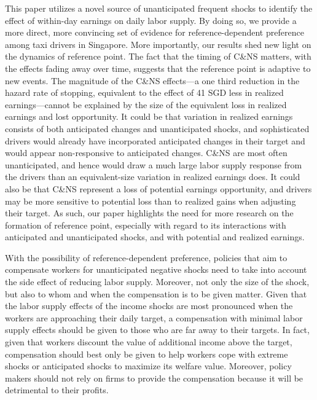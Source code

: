 \documentclass[reviewmode,AEJ]{AEA}
\begin{document}
This paper utilizes a novel source of unanticipated frequent shocks to identify the effect of within-day 
earnings on daily labor supply. By doing so, we provide a more direct, more convincing set of evidence for 
reference-dependent preference among taxi drivers in Singapore. More importantly, our results shed new light 
on the dynamics of reference point. The fact that the timing of C\&NS matters, with the effects fading away
over time, suggests that the reference point is adaptive to new events. The magnitude of the C\&NS effects---a
one third reduction in the hazard rate of stopping, equivalent to the effect of 41 SGD less in realized 
earnings---cannot be explained by the size of the equivalent loss in realized earnings and lost opportunity.
It could be that variation 
in realized earnings consists of both anticipated changes and unanticipated shocks, and sophisticated drivers 
would already have incorporated anticipated changes in their target and would appear non-responsive to
anticipated changes. C\&NS are most often unanticipated, and hence would draw a much large labor supply 
response from the drivers than an equivalent-size variation in realized earnings does. It could also be
that C\&NS represent a loss of potential earnings opportunity, and drivers may be more sensitive to potential
loss than to realized gains when adjusting their target. As such, our paper highlights the need for more research
on the formation of reference point, especially with regard to its interactions with anticipated and
unanticipated shocks, and with potential and realized earnings.


With the possibility of reference-dependent preference, policies that aim to compensate workers for unanticipated negative shocks need to take into account the side effect of reducing labor supply. Moreover, not only the size of the shock, but also to whom and when the compensation is to be given matter. Given that the labor supply effects of the income shocks are most pronounced when the workers are approaching their daily target, a compensation with minimal labor supply effects should be given to those who are far away to their targets. In fact, given that workers discount the value of additional income above the target, compensation should best only be given to help workers cope with extreme shocks or anticipated shocks to maximize its welfare value. Moreover, policy makers should not rely on firms to provide the compensation because it will be detrimental to their profits.



\end{document}
